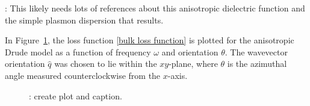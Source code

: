: This likely needs lots of references about this anisotropic dielectric function and the simple plasmon dispersion that results.

In Figure~\ref{figure: anisotropic plasmon spectrum}, the loss function \eqref{bulk loss function} is plotted for the anisotropic Drude model as a function of frequency $\omega$ and orientation $\theta$.  The wavevector orientation $\hat q$ was chosen to lie within the $xy$-plane, where $\theta$ is the azimuthal angle measured counterclockwise from the $x$-axis.  

\begin{figure}
    \centering
    \caption{
        : create plot and caption.
    }
    \label{figure: anisotropic plasmon spectrum}
\end{figure}